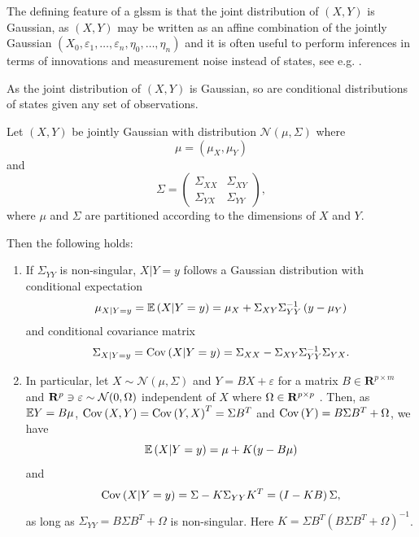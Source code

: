 The defining feature of a \gls{glssm} is that the joint distribution of $(X,Y)$ is Gaussian, as $(X,Y)$ may be written as an affine combination of the jointly Gaussian $(X_{0}, \varepsilon_{1}, \dots, \varepsilon_{n}, \eta_{0}, \dots, \eta_{n})$ and it is often useful to perform inferences in terms of innovations and measurement noise instead of states, see e.g. \citep[Section 4.5]{Durbin2012Time}.

As the joint distribution of $(X, Y)$ is Gaussian, so are conditional distributions of states given any set of observations.

\begin{lemma}
    \label{lem:gaussian_conditional}
    Let $(X,Y)$ be jointly Gaussian with distribution $\mathcal N \left( \mu, \Sigma \right)$ where 
    $$
    \mu = \left(\mu_{X}, \mu_{Y}\right)
    $$
    and 
    $$
    \Sigma = \begin{pmatrix}
        \Sigma_{XX} & \Sigma_{XY} \\
        \Sigma_{YX} & \Sigma_{YY}
    \end{pmatrix},
    $$
    where $\mu$ and $\Sigma$ are partitioned according to the dimensions of $X$ and $Y$. 
    
    Then the following holds:
    
    \begin{enumerate}
        \item \label{it:cond_gaussian} If $\Sigma_{YY}$ is non-singular, $X|Y = y$ follows a Gaussian distribution with conditional expectation
            $$
            \mu_{X|Y = y} = \mathbb E \left( X | Y = y \right) = \mu_{X} + \Sigma_{XY}\Sigma_{YY}^{-1} \left( y - \mu_{Y} \right)
            $$
            and conditional covariance matrix 
            $$
            \Sigma_{X| Y =y} = \operatorname{Cov} \left( X | Y = y \right) = \Sigma_{XX} - \Sigma_{XY} \Sigma_{YY}^{-1} \Sigma_{YX}.
            $$

        \item In particular, let $X\sim \mathcal N(\mu, \Sigma)$ and $Y = BX + \varepsilon$ for a matrix $B \in \mathbf R^{p\times m}$ and $\mathbf R^{p} \ni \varepsilon \sim \mathcal N(0, \Omega)$ independent of $X$ where $\Omega \in \mathbf R^{p\times p}$ . 
            Then, as 
            $\mathbb E Y = B \mu$, $\operatorname{Cov} \left( X,Y \right) = \operatorname{Cov} \left( Y, X \right)^{T}= \Sigma B^{T}$ and $\operatorname{Cov} \left( Y \right) = B \Sigma B^{T} + \Omega$, we have
            $$
                \mathbb E \left( X | Y = y \right) = \mu + K (y - B \mu)
            $$
            and 
            $$
            \operatorname{Cov} \left( X | Y = y \right) = \Sigma - K \Sigma_{YY} K^{T} = \left( I  -  KB \right) \Sigma,
            $$
            as long as $\Sigma_{YY} = B \Sigma B^{T} + \Omega$ is non-singular.
            Here $K = \Sigma B^{T} \left( B \Sigma B^{T} + \Omega \right)^{-1}$.


\end{enumerate}
\end{lemma}
